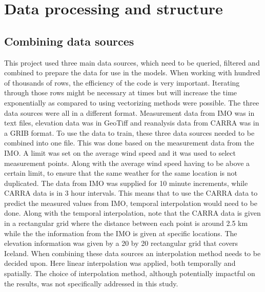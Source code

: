 \chapter{Data processing and structure} %

\label{Chapter3} %


\section{Combining data sources}

This project used three main data sources, which need to be queried, filtered and combined to prepare the data for use in the models. When working with hundred of thousands of rows, the efficiency of the code is very important. Iterating through those rows might be necessary at times but will increase the time exponentially as compared to using vectorizing methods were possible. The three data sources were all in a different format. Measurement data from IMO was in text files, elevation data was in GeoTiff and reanalysis data from CARRA was in a GRIB format. To use the data to train, these three data sources needed to be combined into one file. This was done based on the measurement data from the IMO. A limit was set on the average wind speed and it was used to select measurement points. Along with the average wind speed having to be above a certain limit, to ensure that the same weather for the same location is not duplicated. The data from IMO was supplied for 10 minute increments, while CARRA data is in 3 hour intervals. This means that to use the CARRA data to predict the measured values from IMO, temporal interpolation would need to be done. Along with the temporal interpolation, note that the CARRA data is given in a rectangular grid where the distance between each point is around 2.5 km while the the information from the IMO is given at specific locations. The elevation information was given by a 20 by 20 rectangular grid that covers Iceland. When combining these data sources an interpolation method needs to be decided upon. Here linear interpolation was applied, both temporally and spatially. The choice of interpolation method, although potentially impactful on the results, was not specifically addressed in this study.

